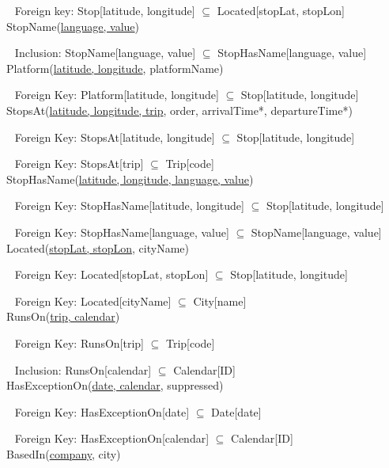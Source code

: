 	$ \ \ $ Foreign key: Stop[latitude, longitude] $\subseteq$ Located[stopLat, stopLon] \\
	
	
	StopName(\uline{language, value})
	
	$ \ \ $ Inclusion: StopName[language, value] $\subseteq$ StopHasName[language, value] \\
	
	
	Platform(\uline{latitude, longitude}, platformName)
	
	$ \ \ $ Foreign Key: Platform[latitude, longitude] $\subseteq$ Stop[latitude, longitude] \\
	
	
	StopsAt(\uline{latitude, longitude, trip}, order, arrivalTime*, departureTime*)
	
	$ \ \ $ Foreign Key: StopsAt[latitude, longitude] $\subseteq$ Stop[latitude, longitude]
	
	$ \ \ $ Foreign Key: StopsAt[trip] $\subseteq$ Trip[code] \\
	
	
	StopHasName(\uline{latitude, longitude, language, value})
	
	$ \ \ $ Foreign Key: StopHasName[latitude, longitude] $\subseteq$ Stop[latitude, longitude]
	
	$ \ \ $ Foreign Key: StopHasName[language, value] $\subseteq$ StopName[language, value] \\
	
	Located(\uline{stopLat, stopLon}, cityName) 
	
	$ \ \ $ Foreign Key: Located[stopLat, stopLon] $\subseteq$ Stop[latitude, longitude]
	
	$ \ \ $ Foreign Key: Located[cityName] $\subseteq$ City[name] \\
	
	\newpage
	RunsOn(\uline{trip, calendar})
	
	$ \ \ $ Foreign Key: RunsOn[trip] $\subseteq$ Trip[code]
	
	$ \ \ $ Inclusion: RunsOn[calendar] $\subseteq$ Calendar[ID] \\
	
	
	HasExceptionOn(\uline{date, calendar}, suppressed)
	
	$ \ \ $ Foreign Key: HasExceptionOn[date] $\subseteq$ Date[date]
	
	$ \ \ $ Foreign Key: HasExceptionOn[calendar] $\subseteq$ Calendar[ID] \\
	

	BasedIn(\uline{company}, city)
	
